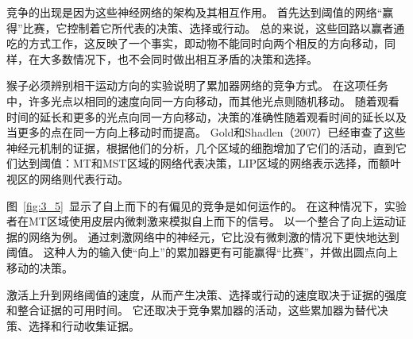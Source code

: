 竞争的出现是因为这些神经网络的架构及其相互作用。
首先达到阈值的网络“赢得”比赛，它控制着它所代表的决策、选择或行动。
总的来说，这些回路以赢者通吃的方式工作，这反映了一个事实，即动物不能同时向两个相反的方向移动，同样，在大多数情况下，也不会同时做出相互矛盾的决策和选择。\par


猴子必须辨别相干运动方向的实验说明了累加器网络的竞争方式。
在这项任务中，许多光点以相同的速度向同一方向移动，而其他光点则随机移动。
随着观看时间的延长和更多的光点向同一方向移动，决策的准确性随着观看时间的延长以及当更多的点在同一方向上移动时而提高\cite{schall2001neural}。
Gold和Shadlen（2007）已经审查了这些神经元机制的证据，根据他们的分析，几个区域的细胞增加了它们的活动，直到它们达到阈值：MT和MST区域的网络代表决策，LIP区域的网络表示选择，而额叶视区的网络则代表行动\cite{kim1999neural}。\par


图~\ref{fig:3_5}~显示了自上而下的有偏见的竞争是如何运作的。
在这种情况下，实验者在MT区域使用皮层内微刺激来模拟自上而下的信号。
以一个整合了向上运动证据的网络为例。
通过刺激网络中的神经元，它比没有微刺激的情况下更快地达到阈值。
这种人为的输入使“向上”的累加器更有可能赢得“比赛”，并做出圆点向上移动的决策。\par


激活上升到网络阈值的速度，从而产生决策、选择或行动的速度取决于证据的强度和整合证据的可用时间。
它还取决于竞争累加器的活动，这些累加器为替代决策、选择和行动收集证据。\par


